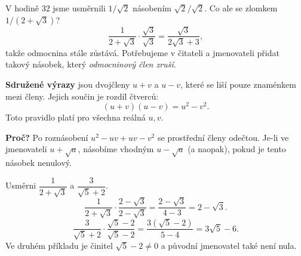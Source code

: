 \documentclass[11pt,a4paper]{article}
\begin{document}

V hodině 32 jsme usměrnili $1/\sqrt2$ násobením $\sqrt2/\sqrt2$.
Co ale se zlomkem $1/(2+\sqrt3)$?
\[
\frac1{2+\sqrt3}\cdot\frac{\sqrt3}{\sqrt3}
=\frac{\sqrt3}{2\sqrt3+3},
\]
takže odmocnina stále zůstává. Potřebujeme v čitateli a jmenovateli
přidat takový násobek, který \emph{odmocninový člen zruší}.

\begin{definiceBox}[title={Definice: sdružené výrazy}]
\textbf{Sdružené výrazy} jsou dvojčleny $u+v$ a $u-v$,
které se liší pouze znaménkem mezi členy.
Jejich součin je rozdíl čtverců:
\[
\boxed{(u+v)(u-v)=u^2-v^2.}
\]
Toto pravidlo platí pro všechna reálná $u,v$.
\end{definiceBox}
\textbf{Proč?} Po roznásobení $u^2-uv+uv-v^2$ se prostřední členy
odečtou. Je-li ve jmenovateli $u+\sqrt a$, násobíme vhodným
$u-\sqrt a$ (a naopak), pokud je tento násobek nenulový.

\begin{prikladReseniBox}[breakable=false,title={Příklad 1: první dvojčlen ve jmenovateli}]
Usměrni $\dfrac1{2+\sqrt3}$ a $\dfrac3{\sqrt5+2}$.
\tcblower
\[
\frac1{2+\sqrt3}\cdot\frac{2-\sqrt3}{2-\sqrt3}
=\frac{2-\sqrt3}{4-3}=\boxed{2-\sqrt3}.
\]
\[
\frac3{\sqrt5+2}\cdot\frac{\sqrt5-2}{\sqrt5-2}
=\frac{3(\sqrt5-2)}{5-4}=\boxed{3\sqrt5-6}.
\]
Ve druhém příkladu je činitel $\sqrt5-2\ne0$ a původní jmenovatel také není nula.
\end{prikladReseniBox}
\end{document}
